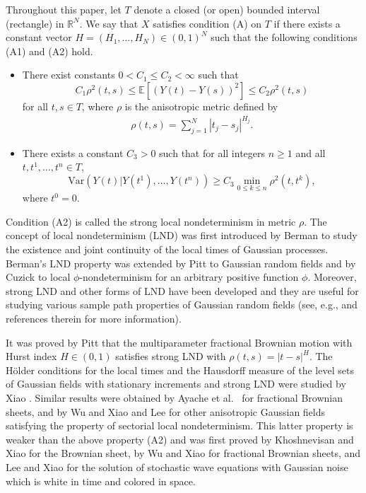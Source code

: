\documentclass[11pt, reqno]{amsart}
\def\R{{\mathbb R}}
\def\E{{\mathbb E}}
\numberwithin{equation}{section}
\begin{document}
Throughout this paper, let $T$ denote a closed (or open) bounded interval (rectangle) in $\R^N$.
We say that $X$ satisfies condition (A) on $T$ if there exists a constant vector $H = (H_1, \dots, H_N) \in (0, 1)^N$ 
such that the following conditions (A1) and (A2) hold.
\begin{itemize}
\item[(A1)]
There exist constants $0 < C_1 \le C_2 < \infty$ such that
\begin{equation*}\label{Eq:metric_rho}
C_1 \rho^2(t, s) \le \E[(Y(t) - Y(s))^2] \le C_2 \rho^2(t, s)
\end{equation*}
for all $t, s \in T$, where $\rho$ is the anisotropic metric defined by
\begin{align}\label{D:rho}
\rho(t, s) = \sum_{j=1}^N |t_j - s_j|^{H_j}.
\end{align}
\item[(A2)]
There exists a constant $C_3 > 0$ such that 
for all integers $n \ge 1$ and all $t, t^1, \dots, t^n \in T$,
\begin{equation*}\label{Eq:SLND_rho}
\mathrm{Var}(Y(t)|Y(t^1), \dots, Y(t^n)) \ge C_3 \min_{0 \le k \le n} \rho^2(t, t^k),
\end{equation*}
where $t^0 = 0$.
\end{itemize}

Condition (A2) is called the strong local nondeterminism in metric $\rho$.
The concept of local nondeterminism (LND) was first introduced by Berman \cite{B73} to study the existence 
and joint continuity of the local times of Gaussian processes. Berman's LND property was extended by Pitt \cite{P78} 
to  Gaussian random fields and  by Cuzick \cite{Cuzick78} to local
$\phi$-nondeterminism for an arbitrary positive function $\phi$. Moreover, strong LND and other forms of LND have 
been developed and they are useful for studying various sample path properties of Gaussian random fields (see, e.g., 
\cite{X06,X08} and references therein for more information).

It was proved by Pitt \cite{P78} that the multiparameter fractional Brownian motion with Hurst index $H \in (0, 1)$ 
satisfies strong LND with $\rho(t, s) = |t - s|^H$. The H\"{o}lder conditions for the local times and the Hausdorff 
measure of the level sets of Gaussian fields with stationary increments and strong LND were studied by Xiao \cite{X97}.
Similar results were obtained by Ayache et al.~\cite{AWX08} for fractional Brownian sheets, and by Wu and Xiao 
\cite{WX11} and Lee \cite{Lee22a, Lee22b} for other anisotropic Gaussian fields satisfying the property of
sectorial local nondeterminism. This latter property is weaker than the above property (A2) and was first
proved by Khoshnevisan and Xiao \cite{KX07} for the Brownian sheet, by Wu and Xiao \cite{WX07}
for fractional Brownian sheets, and Lee and Xiao \cite{LeeX19} for the solution of stochastic wave equations with 
Gaussian noise which is white in time and colored in space.
\end{document}
